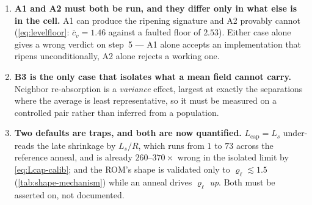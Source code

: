 \documentclass{article}
\begin{document}
\begin{enumerate}[nosep]
\item \textbf{A1 and A2 must both be run, and they differ only in what else is in
      the cell.} A1 can produce the ripening signature and A2 provably cannot
      (\cref{eq:levelfloor}: $\bar c_v=1.46$ against a faulted floor of $2.53$).
      Either case alone gives a wrong verdict on step~5 --- A1 alone accepts an
      implementation that ripens unconditionally, A2 alone rejects a working one.
\item \textbf{B3 is the only case that isolates what a mean field cannot carry.}
      Neighbor re-absorption is a \emph{variance} effect, largest at exactly the
      separations where the average is least representative, so it must be
      measured on a controlled pair rather than inferred from a population.
\item \textbf{Two defaults are traps, and both are now quantified.}
      $L_{\mathrm{cap}}=L_s$ under-reads the late shrinkage by $L_s/R$, which runs
      from $1$ to $73$ across the reference anneal, and is already
      $260$--$370\times$ wrong in the isolated limit by \cref{eq:Lcap-calib}; and
      the ROM's shape is validated only to $\varrho_\ell\lesssim1.5$
      (\cref{tab:shape-mechanism}) while an anneal drives $\varrho_\ell$
      \emph{up}. Both must be asserted on, not documented.
\end{enumerate}
\end{document}

